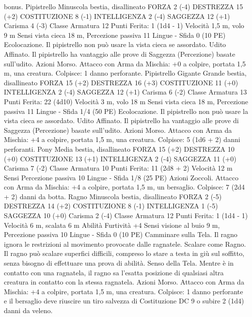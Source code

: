\begin{multicols}{2}
bonus.
Pipistrello
Minuscola bestia, disallineato
FORZA 2 (-4)
DESTREZZA 15 (+2)
COSTITUZIONE 8 (-1)
INTELLIGENZA 2 (-4)
SAGGEZZA 12 (+1)
Carisma 4 (-3)
Classe Armatura 12
\hspace*{0pt}\hfill{Punti Ferita}: 1 (1d4 - 1)
Velocità 1,5 m, volo 9 m
Sensi vista cieca 18 m, Percezione passiva 11
Lingue -
Sfida 0 (10 PE)
Ecolocazione. Il pipistrello non può usare la vista cieca se
assordato.
Udito Affinato. Il pipistrello ha vantaggio alle prove di Saggezza
(Percezione) basate sull’udito.
Azioni
Morso. Attacco con Arma da Mischia: +0 a colpire, portata 1,5
m, una creatura.
Colpisce: 1 danno perforante.
Pipistrello Gigante
Grande bestia, disallineato
FORZA 15 (+2)
DESTREZZA 16 (+3)
COSTITUZIONE 11 (+0)
INTELLIGENZA 2 (-4)
SAGGEZZA 12 (+1)
Carisma 6 (-2)
Classe Armatura 13
\hspace*{0pt}\hfill{Punti Ferita}: 22 (4d10)
Velocità 3 m, volo 18 m
Sensi vista cieca 18 m, Percezione passiva 11
Lingue -
Sfida 1/4 (50 PE)
Ecolocazione. Il pipistrello non può usare la vista cieca se
assordato.
Udito Affinato. Il pipistrello ha vantaggio alle prove di Saggezza
(Percezione) basate sull’udito.
Azioni
Morso. Attacco con Arma da Mischia: +4 a colpire, portata 1,5
m, una creatura.
Colpisce: 5 (1d6 + 2) danni perforanti.
Pony
Media bestia, disallineato
FORZA 15 (+2)
DESTREZZA 10 (+0)
COSTITUZIONE 13 (+1)
INTELLIGENZA 2 (-4)
SAGGEZZA 11 (+0)
Carisma 7 (-2)
Classe Armatura 10
\hspace*{0pt}\hfill{Punti Ferita}: 11 (2d8 + 2)
Velocità 12 m
Sensi Percezione passiva 10
Lingue -
Sfida 1/8 (25 PE)
Azioni
Zoccoli. Attacco con Arma da Mischia: +4 a colpire, portata 1,5
m, un bersaglio.
Colpisce: 7 (2d4 + 2) danni da botta.
Ragno
Minuscola bestia, disallineato
FORZA 2 (-5)
DESTREZZA 14 (+2)
COSTITUZIONE 8 (-1)
INTELLIGENZA 1 (-5)
SAGGEZZA 10 (+0)
Carisma 2 (-4)
Classe Armatura 12
\hspace*{0pt}\hfill{Punti Ferita}: 1 (1d4 - 1)
Velocità 6 m, scalata 6 m
Abilità Furtività +4
Sensi visione al buio 9 m, Percezione passiva 10
Lingue -
Sfida 0 (10 PE)
Camminare sulla Tela. Il ragno ignora le restrizioni al
movimento provocate dalle ragnatele.
Scalare come Ragno. Il ragno può scalare superfici difficili,
compreso lo stare a testa in giù sul soffitto, senza bisogno di
effettuare una prova di abilità.
Senso della Tela. Mentre è in contatto con una ragnatela, il
ragno sa l’esatta posizione di qualsiasi altra creatura in contatto
con la stessa ragnatela.
Azioni
Morso. Attacco con Arma da Mischia: +4 a colpire, portata 1,5
m, una creatura.
Colpisce: 1 danno perforante e il bersaglio deve riuscire un tiro
salvezza di Costituzione DC 9 o subire 2 (1d4) danni da veleno.
 

\end{multicols}
